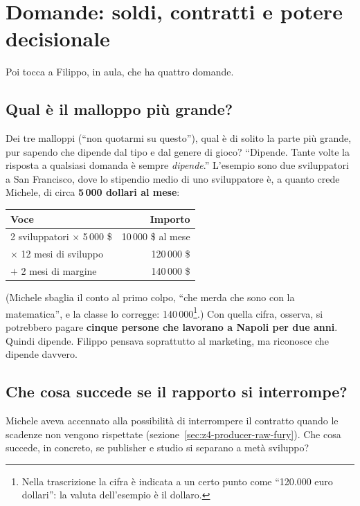 \section{Domande: soldi, contratti e potere decisionale}
\label{sec:z4-qa-filippo}

Poi tocca a Filippo, in aula, che ha quattro domande.

\subsection{Qual è il malloppo più grande?}

Dei tre malloppi (``non quotarmi su questo''), qual è di solito la parte più
grande, pur sapendo che dipende dal tipo e dal genere di gioco? ``Dipende.
Tante volte la risposta a qualsiasi domanda è sempre \emph{dipende}.'' L'esempio
sono due sviluppatori a San Francisco, dove lo stipendio medio di uno
sviluppatore è, a quanto crede Michele, di circa \textbf{5\,000 dollari al mese}:
\begin{center}
  \begin{tabular}{@{}lr@{}}
    \toprule
    \textbf{Voce} & \textbf{Importo} \\
    \midrule
    2 sviluppatori \(\times\) 5\,000 \$ & 10\,000 \$ al mese \\
    \(\times\) 12 mesi di sviluppo & 120\,000 \$ \\
    \(+\) 2 mesi di margine & 140\,000 \$ \\
    \bottomrule
  \end{tabular}
\end{center}
(Michele sbaglia il conto al primo colpo, ``che merda che sono con la
matematica'', e la classe lo corregge: 140\,000\footnote{Nella trascrizione la
cifra è indicata a un certo punto come ``120.000 euro dollari'': la valuta
dell'esempio è il dollaro.}.) Con quella cifra, osserva, si potrebbero pagare
\textbf{cinque persone che lavorano a Napoli per due anni}. Quindi dipende.
Filippo pensava soprattutto al marketing, ma riconosce che dipende davvero.

\subsection{Che cosa succede se il rapporto si interrompe?}

Michele aveva accennato alla possibilità di interrompere il contratto quando le
scadenze non vengono rispettate (sezione~\ref{sec:z4-producer-raw-fury}). Che
cosa succede, in concreto, se publisher e studio si separano a metà sviluppo?

